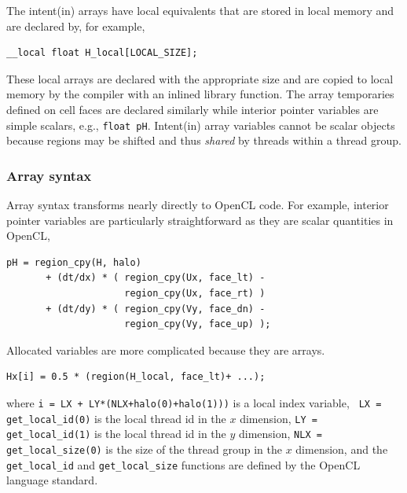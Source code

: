 The intent(in) arrays have local equivalents that are stored in local memory
and are declared by, for example,
{\small
\begin{verbatim}
__local float H_local[LOCAL_SIZE];
\end{verbatim}
}
\noindent
These local arrays are declared with the appropriate size and are
copied to local memory by the compiler with an inlined library function.  The
array temporaries defined on cell faces are declared similarly while interior
pointer variables are simple scalars, e.g., {\tt float pH}.  Intent(in) array
variables cannot be scalar objects because regions may be shifted and thus
\emph{shared} by threads within a thread group.

\subsubsection{Array syntax}

Array syntax transforms nearly directly to OpenCL code.  For example, interior
pointer variables are particularly straightforward as they are scalar quantities in
OpenCL,
{\small
\begin{verbatim}
pH = region_cpy(H, halo)
       + (dt/dx) * ( region_cpy(Ux, face_lt) -
                     region_cpy(Ux, face_rt) )
       + (dt/dy) * ( region_cpy(Vy, face_dn) -
                     region_cpy(Vy, face_up) );
\end{verbatim}
}
\noindent
Allocated variables are more complicated because they are arrays.
{\small
\begin{verbatim}
Hx[i] = 0.5 * (region(H_local, face_lt)+ ...);
\end{verbatim}
}
\noindent
where {\tt i = LX + LY*(NLX+halo(0)+halo(1)))} is a local index variable, {\tt
  LX = get\_local\_id(0)} is the local thread id in the $x$ dimension, {\tt LY =
  get\_local\_id(1)} is the local thread id in the $y$ dimension, {\tt NLX =
  get\_local\_size(0)} is the size of the thread group in the $x$ dimension, and
the {\tt get\_local\_id} and {\tt get\_local\_size} functions are defined by the
OpenCL language standard.
